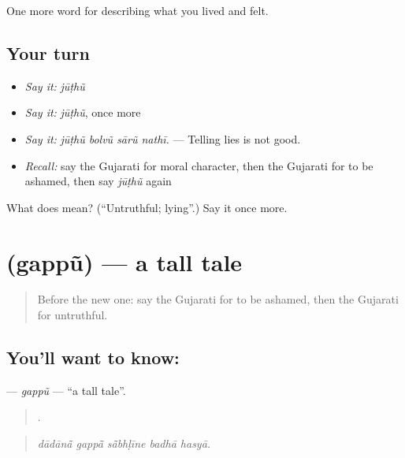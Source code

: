 \begin{grammarlens}[title={What you've built}]
One more word for describing what you lived and felt.
\end{grammarlens}

\subsection*{Your turn}
\begin{itemize}
\raggedright
  \item \emph{Say it:} \emph{jūṭhũ}
  \item \emph{Say it:} \emph{jūṭhũ}, once more
  \item \emph{Say it:} \emph{jūṭhũ bolvũ sārũ nathī.} — Telling lies is not good.
  \item \emph{Recall:} say the Gujarati for moral character, then the Gujarati for to be ashamed, then say \emph{jūṭhũ} again
\end{itemize}

\begin{tcolorbox}[breakable,colback=teal!4,colframe=teal!35!black,title={Before you move on}]
What does  mean? (\textquotedblleft{}Untruthful; lying\textquotedblright{}.) Say it once more.
\end{tcolorbox}
\section[\texorpdfstring{\gu{ગપ્પું} (gappũ)}{ગપ્પું (gappũ)}]{ (gappũ) — a tall tale}

\label{lesson:GU-C468-gappu}



\begin{quote}
Before the new one: say the Gujarati for to be ashamed, then the Gujarati for untruthful.
\end{quote}

\subsection*{You'll want to know: }
\textbf{} — \emph{gappũ} — \textquotedblleft{}a tall tale\textquotedblright{}.

\begin{quote}
    .
\end{quote}

\begin{quote}
\emph{dādānā̃ gappā̃ sā̃bhḷīne badhā hasyā.}
\end{quote}

